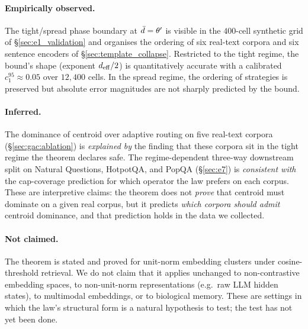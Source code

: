 \paragraph{Empirically observed.} The tight/spread phase boundary at
$\bar{d} = \theta'$ is visible in the $400$-cell synthetic grid of
\S\ref{sec:e1_validation} and organises the ordering of six real-text
corpora and six sentence encoders of
\S\ref{sec:template_collapse}. Restricted to the tight regime, the
bound's shape (exponent ${d_{\mathrm{eff}}}/2$) is quantitatively accurate with a
calibrated $c_1^{95} \approx 0.05$ over $12{,}400$ cells. In the spread
regime, the ordering of strategies is preserved but absolute error
magnitudes are not sharply predicted by the bound.

\paragraph{Inferred.} The dominance of centroid over adaptive routing
on five real-text corpora (\S\ref{sec:gac:ablation}) is
\emph{explained by} the finding that these corpora sit in the tight
regime the theorem declares safe. The regime-dependent three-way
downstream split on Natural Questions, HotpotQA, and PopQA
(\S\ref{sec:e7}) is \emph{consistent with} the cap-coverage prediction
for which operator the law prefers on each corpus. These are
interpretive claims: the theorem does not \emph{prove} that centroid
must dominate on a given real corpus, but it predicts \emph{which
corpora should admit} centroid dominance, and that prediction holds in
the data we collected.

\paragraph{Not claimed.} The theorem is stated and proved for unit-norm
embedding clusters under cosine-threshold retrieval. We do not claim
that it applies unchanged to non-contrastive embedding spaces, to
non-unit-norm representations (e.g.\ raw LLM hidden states), to
multimodal embeddings, or to biological memory. These are settings in
which the law's structural form is a natural hypothesis to test; the
test has not yet been done.
